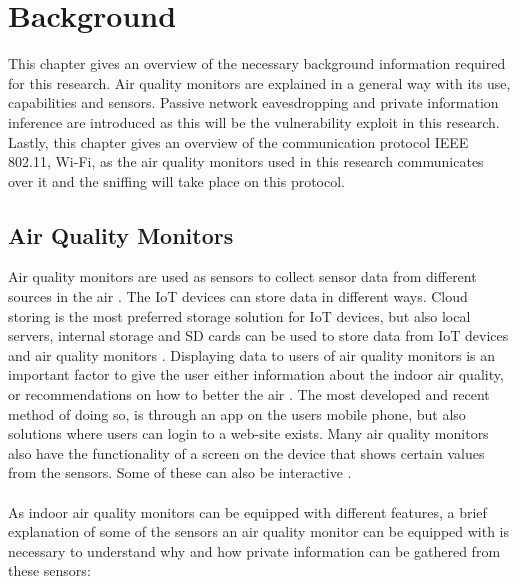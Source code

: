 \chapter{Background}
This chapter gives an overview of the necessary background information required for this research. Air quality monitors are explained in a general way with its use, capabilities and sensors. Passive network eavesdropping and private information inference are introduced as this will be the vulnerability exploit in this research. Lastly, this chapter gives an overview of the communication protocol IEEE 802.11, Wi-Fi, as the air quality monitors used in this research communicates over it and the sniffing will take place on this protocol.

\section{Air Quality Monitors}
Air quality monitors are used as sensors to collect sensor data from different sources in the air \cite{GeneralAirQualityMonitor}. The IoT devices can store data in different ways. Cloud storing is the most preferred storage solution for IoT devices, but also local servers, internal storage and SD cards can be used to store data from IoT devices and air quality monitors \cite{AQMBigSource}. Displaying data to users of air quality monitors is an important factor to give the user either information about the indoor air quality, or recommendations on how to better the air \cite{AQMBigSource}. The most developed and recent method of doing so, is through an app on the users mobile phone, but also solutions where users can login to a web-site exists. Many air quality monitors also have the functionality of a screen on the device that shows certain values from the sensors. Some of these can also be interactive \cite{AQMBigSource}.
\\\\
As indoor air quality monitors can be equipped with different features, a brief explanation of some of the sensors an air quality monitor can be equipped with is necessary to understand why and how private information can be gathered from these sensors:

